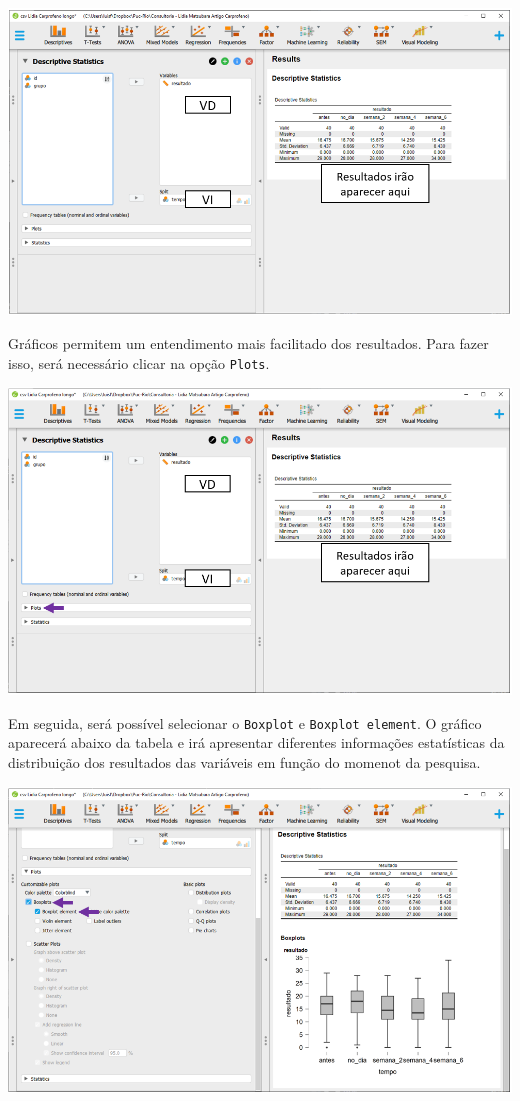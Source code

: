 \documentclass[
]{book}
\begin{document}
\includegraphics{./img/cap_lmm_descriptives3.png}

Gráficos permitem um entendimento mais facilitado dos resultados. Para
fazer isso, será necessário clicar na opção \texttt{Plots}.

\includegraphics{./img/cap_lmm_plots.png}

Em seguida, será possível selecionar o \texttt{Boxplot} e
\texttt{Boxplot\ element}. O gráfico aparecerá abaixo da tabela e irá
apresentar diferentes informações estatísticas da distribuição dos
resultados das variáveis em função do momenot da pesquisa.

\includegraphics{./img/cap_lmm_boxplots1.png}
\end{document}
